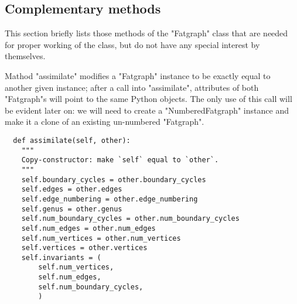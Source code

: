 \subsection{Complementary methods}
\label{sec:complementary}

This section briefly lists those methods of the "Fatgraph" class that
are needed for proper working of the class, but do not have any
special interest by themselves.

Mathod "assimilate" modifies a "Fatgraph" instance to be exactly equal
to another given instance; after a call into "assimilate", attributes
of both "Fatgraph"s will point to the same Python objects.  The only
use of this call will be evident later on: we will need to create a
"NumberedFatgraph" instance and make it a clone of an existing
un-numbered "Fatgraph".
\begin{lstlisting}
  def assimilate(self, other):
    """
    Copy-constructor: make `self` equal to `other`.
    """
    self.boundary_cycles = other.boundary_cycles
    self.edges = other.edges
    self.edge_numbering = other.edge_numbering
    self.genus = other.genus
    self.num_boundary_cycles = other.num_boundary_cycles
    self.num_edges = other.num_edges
    self.num_vertices = other.num_vertices
    self.vertices = other.vertices
    self.invariants = (
        self.num_vertices,
        self.num_edges,
        self.num_boundary_cycles,
        )

\end{lstlisting}


